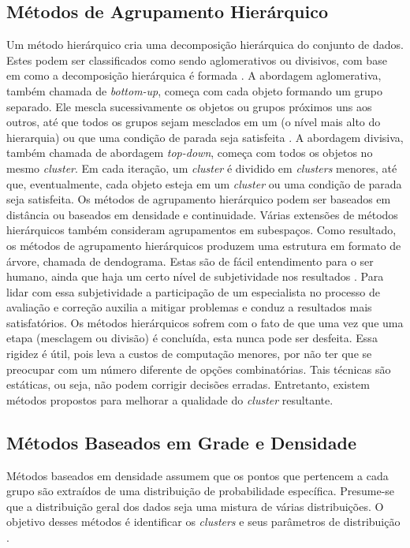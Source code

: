 \documentclass[tcc2]{classe_uftex/uftex}
\begin{document}
    \subsection{Métodos de Agrupamento Hierárquico}
    \label{subsec:hierarquico}
    Um método hierárquico cria uma decomposição hierárquica do conjunto de dados. Estes podem ser classificados como sendo aglomerativos ou divisivos, com base em como a decomposição hierárquica é formada \cite{2010:Maimon}. A abordagem aglomerativa, também chamada de \emph{bottom-up}, começa com cada objeto formando um grupo separado. Ele mescla sucessivamente os objetos ou grupos próximos uns aos outros, até que todos os grupos sejam mesclados em um (o nível mais alto do hierarquia) ou que uma condição de parada seja satisfeita \cite{2012:Han}. A abordagem divisiva, também chamada de abordagem \emph{top-down}, começa com todos os objetos no mesmo \emph{cluster}. Em cada iteração, um \emph{cluster} é dividido em \emph{clusters} menores, até que, eventualmente, cada objeto esteja em um \emph{cluster} ou uma condição de parada seja satisfeita. Os métodos de agrupamento hierárquico podem ser baseados em distância ou baseados em densidade e continuidade. Várias extensões de métodos hierárquicos também consideram agrupamentos em subespaços. Como resultado, os métodos de agrupamento hierárquicos produzem uma estrutura em formato de árvore, chamada de dendograma. Estas são de fácil entendimento para o ser humano, ainda que haja um certo nível de subjetividade nos resultados \cite{1988:Jain}. Para lidar com essa subjetividade a participação de um especialista no processo de avaliação e correção auxilia a mitigar problemas e conduz a resultados mais satisfatórios. Os métodos hierárquicos sofrem com o fato de que uma vez que uma etapa (mesclagem ou divisão) é concluída, esta nunca pode ser desfeita. Essa rigidez é útil, pois leva a custos de computação menores, por não ter que se preocupar com um número diferente de opções combinatórias. Tais técnicas são estáticas, ou seja, não podem corrigir decisões erradas. Entretanto, existem métodos propostos para melhorar a qualidade do \emph{cluster} resultante.%
    
    \subsection{Métodos Baseados em Grade e Densidade}
    \label{subsec:densidade}%
    Métodos baseados em densidade assumem que os pontos que pertencem a cada grupo são extraídos de uma distribuição de probabilidade específica. Presume-se que a distribuição geral dos dados seja uma mistura de várias distribuições. O objetivo desses métodos é identificar os \emph{clusters} e seus parâmetros de distribuição \cite{2010:Maimon}.
    
\end{document}
